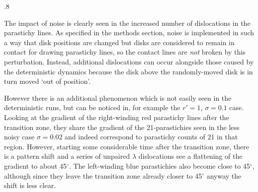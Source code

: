  {.8}

The impact of noise is clearly seen in the increased number of dislocations in the parastichy lines. As specified in the methods section,  noise is implemented in such a way that disk positions are changed but disks are considered to remain in contact for drawing parastichy lines, so the contact lines are \textit{not} broken by this perturbation. Instead, additional dislocations can occur alongside those caused by the deterministic dynamics because the disk above the randomly-moved disk is in turn moved `out of position'. 

However there is an additional phenomenon which is not easily seen in the deterministic runs, but can be noticed in, for example the $r'=1$, $\sigma=0.1$ case. Looking at the gradient of the right-winding red parastichy lines after the transition zone, they share the gradient of the 21-parastichies seen in the less noisy case $\sigma=0.02$ and indeed correspond to parastichy counts of 21 in that region. However, starting some considerable time after the transition zone, there is a pattern shift and a series of unpaired $\lambda$ dislocations see a flattening of the gradient to about 45$^\circ$. The left-winding blue parastichies  also  become close to 45$^\circ$, although since they leave the transition zone already closer to 45$^\circ$ anyway the shift is less clear. 

